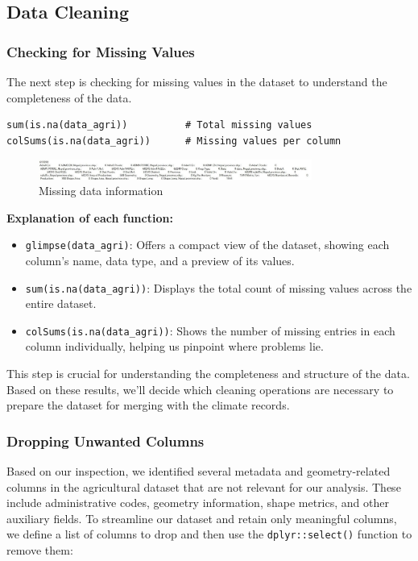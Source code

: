\subsection*{Data Cleaning}
\subsubsection*{Checking for Missing Values}
The next step is checking for missing values in the dataset to understand the completeness of the data.

\begin{verbatim}
sum(is.na(data_agri))          # Total missing values
colSums(is.na(data_agri))      # Missing values per column
\end{verbatim}

\begin{figure}[h]
\centering
\includegraphics[width=0.8\textwidth]{figures/missing_data_agri.jpg}
\caption{Missing data information
}

\end{figure}

\textbf{Explanation of each function:}
\begin{itemize}
    \item \texttt{glimpse(data\_agri)}: Offers a compact view of the dataset, showing each column’s name, data type, and a preview of its values.
    \item \texttt{sum(is.na(data\_agri))}: Displays the total count of missing values across the entire dataset.
    \item \texttt{colSums(is.na(data\_agri))}: Shows the number of missing entries in each column individually, helping us pinpoint where problems lie.
\end{itemize}

This step is crucial for understanding the completeness and structure of the data. Based on these results, we’ll decide which cleaning operations are necessary to prepare the dataset for merging with the climate records.

\subsubsection*{Dropping Unwanted Columns}
Based on our inspection, we identified several metadata and geometry-related columns in the agricultural dataset that are not relevant for our analysis. These include administrative codes, geometry information, shape metrics, and other auxiliary fields. To streamline our dataset and retain only meaningful columns, we define a list of columns to drop and then use the \texttt{dplyr::select()} function to remove them:

